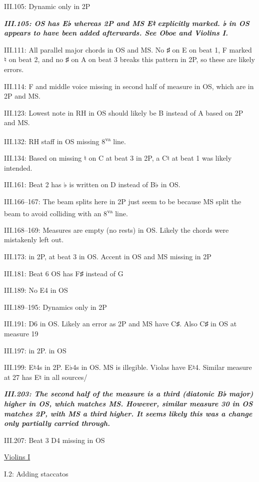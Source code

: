 \documentclass[twoside]{article}
\newcommand\dynmark[1]{\scalebox{0.9}{#1}{\kern1pt}}
\begin{document}
\begin{hangparas}{15pt}{1}
\begin{multicols}{2}
III.105: Dynamic only in 2P

\textbf{\textit{III.105: OS has E♭ whereas 2P and MS E♮ explicitly marked. ♭ in OS appears to have been added afterwards. See Oboe and Violins I.}}

III.111: All parallel major chords in OS and MS. No ♯ on E on beat 1, F marked ♮ on beat 2, and no ♯ on A on beat 3 breaks this pattern in 2P, so these are likely errors.

III.114: F and middle voice missing in second half of measure in OS, which are in 2P and MS.

III.123: Lowest note in RH in OS should likely be B instead of A based on 2P and MS.

III.132: RH staff in OS missing 8\textsuperscript{va} line.

III.134: Based on missing ♮ on C at beat 3 in 2P, a C♮ at beat 1 was likely intended.

III.161: Beat 2 has ♭ is written on D instead of B♭ in OS.

III.166--167: The beam splits here in 2P just seem to be because MS split the beam to avoid colliding with an 8\textsuperscript{va} line.

III.168--169: Measures are empty (no rests) in OS. Likely the chords were mistakenly left out.

III.173: \dynmark{\mezzopiano} in 2P, \dynmark{\mf} at beat 3 in OS. Accent in OS and MS missing in 2P

III.181: Beat 6 OS has F♯ instead of G

III.189: No E4 in OS

III.189--195: Dynamics only in 2P

III.191: D6 in OS. Likely an error as 2P and MS have C♯. Also C♯ in OS at measure 19

III.197: \dynmark{\f} in 2P. \dynmark{\ff} in OS

III.199: E♮4s in 2P. E♭4s in OS. MS is illegible. Violas have E♮4. Similar measure at 27 has E♮ in all sources/

\textbf{\textit{III.203: The second half of the measure is a third (diatonic B♭ major) higher in OS, which matches MS. However, similar measure 30 in OS matches 2P, with MS a third higher. It seems likely this was a change only partially carried through.}}

III.207: Beat 3 D4 missing in OS

\underline{Violins I}

I.2: Adding staccatos


\end{multicols}
\end{hangparas}
\end{document}

